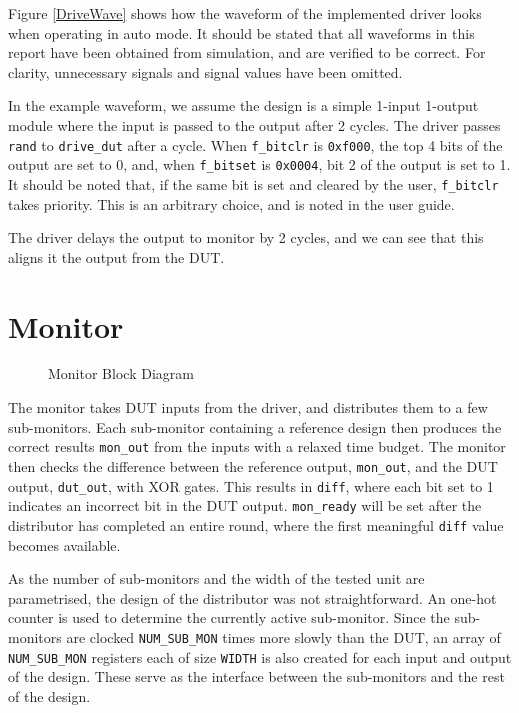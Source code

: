Figure \ref{DriveWave} shows how the waveform of the implemented driver looks when operating in auto mode.
It should be stated that all waveforms in this report have been obtained from simulation, and are verified to be correct.
For clarity, unnecessary signals and signal values have been omitted.

In the example waveform, we assume the design is a simple 1-input 1-output module where the input is passed to the output after 2 cycles.
The driver passes \texttt{rand} to \texttt{drive\_dut} after a cycle.
When \texttt{f\_bitclr} is \texttt{0xf000}, the top 4 bits of the output are set to 0, and, when \texttt{f\_bitset} is \texttt{0x0004}, bit 2 of the output is set to 1.
It should be noted that, if the same bit is set and cleared by the user, \texttt{f\_bitclr} takes priority.
This is an arbitrary choice, and is noted in the user guide.

The driver delays the output to monitor by 2 cycles, and we can see that this aligns it the output from the DUT.

\section{Monitor}
\begin{figure}[H]
  \centering
  
  \caption{Monitor Block Diagram}
  \label{MonitorBlk}
\end{figure}

The monitor takes DUT inputs from the driver, and distributes them to a few sub-monitors.
Each sub-monitor containing a reference design then produces the correct results \texttt{mon\_out} from the inputs with a relaxed time budget.
The monitor then checks the difference between the reference output, \texttt{mon\_out}, and the DUT output, \texttt{dut\_out}, with XOR gates.
This results in \texttt{diff}, where each bit set to 1 indicates an incorrect bit in the DUT output.
\texttt{mon\_ready} will be set after the distributor has completed an entire round, where the first meaningful \texttt{diff} value becomes available.

As the number of sub-monitors and the width of the tested unit are parametrised, the design of the distributor was not straightforward.
An one-hot counter is used to determine the currently active sub-monitor.
Since the sub-monitors are clocked \texttt{NUM\_SUB\_MON} times more slowly than the DUT, an array of \texttt{NUM\_SUB\_MON} registers each of size \texttt{WIDTH} is also created for each input and output of the design.
These serve as the interface between the sub-monitors and the rest of the design.

